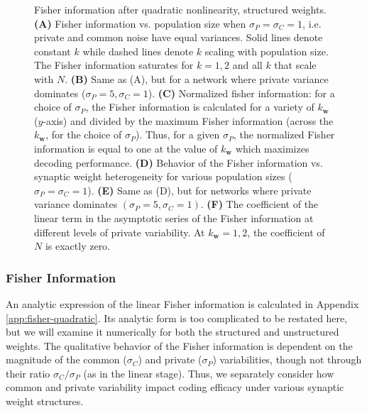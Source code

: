 \documentclass[12pt]{article}
\begin{document}
\begin{figure}[t]
	\centering
	\caption{Fisher information after quadratic nonlinearity, structured weights. \textbf{(A)} Fisher information vs. population size when $\sigma_P=\sigma_C =1$, i.e. private and common noise have equal variances. Solid lines denote constant $k$ while dashed lines denote $k$ scaling with population size. The Fisher information saturates for $k=1,2$ and all $k$ that scale with $N$. \textbf{(B)} Same as (A), but for a network where private variance dominates ($\sigma_P =5, \sigma_C =1$). \textbf{(C)} Normalized fisher information: for a choice of $\sigma_P$, the Fisher information is calculated for a variety of $k_{\mathbf{w}}$ ($y$-axis) and divided by the maximum Fisher information (across the $k_{\mathbf{w}}$, for the choice of $\sigma_P$). Thus, for a given $\sigma_P$, the normalized Fisher information is equal to one at the value of $k_{\mathbf{w}}$ which maximizes decoding performance. \textbf{(D)} Behavior of the Fisher information vs. synaptic weight heterogeneity for various population sizes ($\sigma_P=\sigma_C=1$). \textbf{(E)} Same as (D), but for networks where private variance dominates $(\sigma_P=5, \sigma_C=1)$. \textbf{(F)} The coefficient of the linear term in the asymptotic series of the Fisher information at different levels of private variability. At $k_{\mathbf{w}}=1,2$, the coefficient of $N$ is exactly zero.}
	\label{fig:fisher-quadratic}
\end{figure}
	
\subsubsection{Fisher Information}
An analytic expression of the linear Fisher information is calculated in Appendix \ref{app:fisher-quadratic}. Its analytic form is too complicated to be restated here, but we will examine it numerically for both the structured and unstructured weights. The qualitative behavior of the Fisher information is dependent on the magnitude of the common ($\sigma_C$) and private ($\sigma_P$) variabilities, though not through their ratio $\sigma_C/\sigma_P$ (as in the linear stage). Thus, we separately consider how common and private variability impact coding efficacy under various synaptic weight structures.
	
\end{document}

